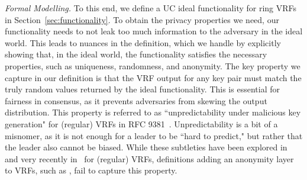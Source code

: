\smallskip
\noindent \emph{Formal Modelling.} To this end,
we define a UC ideal functionality for ring VRFs in Section~\ref{sec:functionality}. To obtain the privacy properties we need, our functionality needs to not leak too much information to the adversary in the ideal world. 
This leads to nuances in the definition, which we handle by explicitly showing that, in the ideal world, the functionality satisfies the necessary properties, such as uniqueness, randomness, and anonymity. 
The key property we capture in our definition is that the VRF output for any key pair must match the truly random values returned by the ideal functionality.
This is essential for fairness in consensus, as it prevents adversaries from skewing the output distribution.
This property is referred to as ``unpredictability under malicious key generation" for (regular) VRFs in RFC 9381~\cite{VRF-RFC}.
Unpredictability is a bit of a misnomer, as it is not enough for a leader to be ``hard to predict," but rather that the leader also cannot be biased.
While these subtleties have been explored in \cite{DavidGKR18} and very recently in~\cite{UnbiasableVRF} for (regular) VRFs, definitions adding an anonymity layer to VRFs, such as \cite{GaneshOT19,YinZXLR22}, fail to capture this property.

